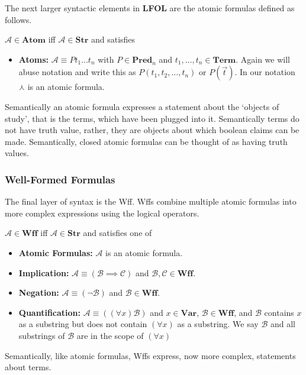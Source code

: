 \documentclass[12pt]{article}
\newcommand{\mc}[1]{\mathcal{#1}}
\begin{document}
The next larger syntactic elements in \textbf{LFOL} are the atomic formulas defined as follows.

$\mc{A} \in \textbf{Atom}$ iff $\mc{A} \in \textbf{Str}$ and satisfies

\begin{itemize}
\item{\textbf{Atoms:} $\mc{A} \equiv Pt_1\ldots t_n$ with $P\in \textbf{Pred}_n$ and $t_1, \ldots, t_n \in \textbf{Term}$. Again we will abuse notation and write this as $P(t_1,t_2,\ldots,t_n)$ or $P(\vec{t})$. In our notation $\curlywedge$ is an atomic formula.}
\end{itemize}

Semantically an atomic formula expresses a statement about the `objects of study', that is the terms, which have been plugged into it.
Semantically terms do not have truth value, rather, they are objects about which boolean claims can be made.
Semantically, closed atomic formulas can be thought of as having truth values.

\hrulefill

\subsubsection*{Well-Formed Formulas}

The final layer of syntax is the Wff.
Wffs combine multiple atomic formulas into more complex expressions using the logical operators.

$\mc{A} \in \textbf{Wff}$ iff $\mc{A} \in \textbf{Str}$ and satisfies one of 

\begin{itemize}
\item{\textbf{Atomic Formulas:} $\mc{A}$ is an atomic formula.}
\item{\textbf{Implication:} $\mc{A}\equiv (\mc{B}\implies \mc{C})$ and $\mc{B}, \mc{C} \in \textbf{Wff}$.}
\item{\textbf{Negation:} $\mc{A}\equiv (\lnot \mc{B})$ and $\mc{B} \in \textbf{Wff}$.}
\item{\textbf{Quantification:} $\mc{A}\equiv ((\forall x)\mc{B})$ and $x\in \textbf{Var}$, $\mc{B}\in \textbf{Wff}$, and $\mc{B}$ contains $x$ as a substring but does not contain $(\forall x)$ as a substring. We say $\mc{B}$ and all substrings of $\mc{B}$ are in the scope of $(\forall x)$} 
\end{itemize}

Semantically, like atomic formulas, Wffs express, now more complex, statements about terms.
\end{document}
